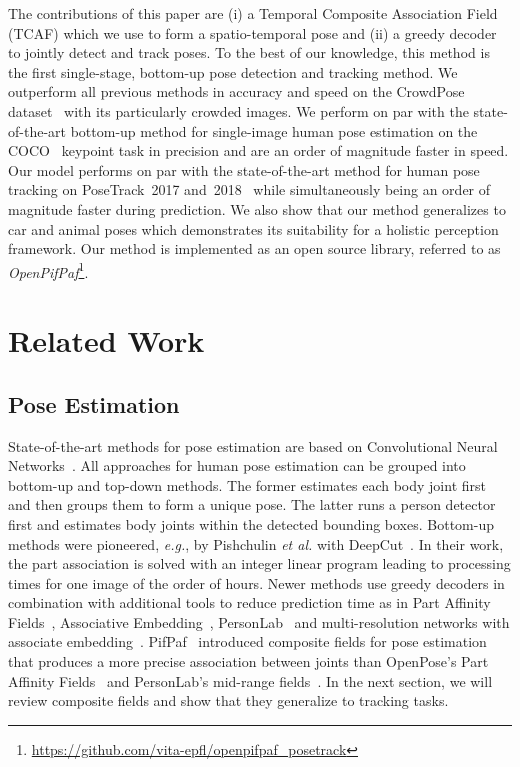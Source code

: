 \documentclass[journal]{IEEEtran}
\begin{document}
The contributions of this paper are
(i) a Temporal Composite Association Field (TCAF) which we use to form a
spatio-temporal pose and
(ii) a greedy decoder to jointly detect and track poses.
To the best of our knowledge, this method is the first single-stage, bottom-up pose detection and tracking method.
We outperform all previous methods in accuracy and speed
on the CrowdPose dataset~\cite{li2019crowdpose} with its particularly crowded images.
We perform
on par with the state-of-the-art bottom-up method for single-image human pose estimation on
the COCO~\cite{lin2014microsoft} keypoint task in precision and are an order of magnitude faster in speed.
Our model performs on par with the state-of-the-art method for human pose tracking on
PoseTrack~2017 and~2018~\cite{andriluka2018posetrack} while simultaneously being
an order of magnitude faster during prediction.
We also show that our method generalizes to car and animal poses which
demonstrates its suitability for a holistic perception framework.
Our method is implemented as an open source library, referred to as
\textit{OpenPifPaf}\footnote{\url{https://github.com/vita-epfl/openpifpaf_posetrack}}.





\section{Related Work}


\subsection{Pose Estimation}

State-of-the-art methods for pose estimation are based on
Convolutional Neural Networks~\cite{toshev2014deeppose,he2017mask,cao2017realtime,newell2017associative,papandreou2018personlab,xiao2018simple,sun2019deep,wei2016convolutional,newell2016stacked,kocabas2018multiposenet,cheng2020higherhrnet}.
All approaches for human pose estimation can be grouped into bottom-up and
top-down methods. The former estimates each body joint first and then groups
them to form a unique pose. The latter runs a person detector first and estimates
body joints within the detected bounding boxes.
Bottom-up methods were pioneered, \textit{e.g.}, by Pishchulin \emph{et al.} with
DeepCut~\cite{pishchulin2016deepcut}.
In their work, the part
association is solved with an integer linear program leading to processing
times for one image of the order of hours.
Newer methods use greedy decoders in combination with
additional tools to reduce prediction time as in
Part Affinity Fields~\cite{cao2017realtime},
Associative Embedding~\cite{newell2017associative},
PersonLab~\cite{papandreou2018personlab} and
multi-resolution networks with associate embedding~\cite{cheng2020higherhrnet}.
PifPaf~\cite{kreiss2019pifpaf} introduced composite fields for pose estimation
that produces a more precise association between joints than
OpenPose's Part Affinity Fields~\cite{cao2017realtime} and
PersonLab's mid-range fields~\cite{papandreou2018personlab}.
In the next section, we will review composite fields and show that they
generalize to tracking tasks.
\end{document}
